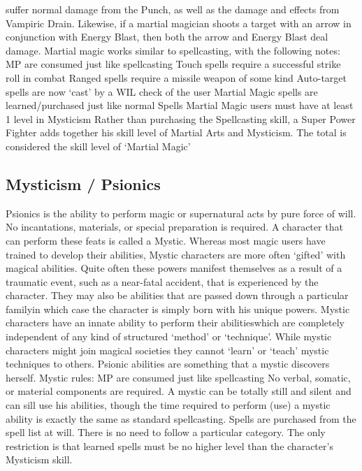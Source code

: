 \documentclass[twoside]{book}
\begin{document}
               suffer normal damage from the Punch, as well as the damage
               and effects from Vampiric Drain. Likewise, if a martial
               magician shoots a target with an arrow in conjunction with
               Energy Blast, then both the arrow and Energy Blast deal
               damage.   Martial magic works similar to spellcasting, with
               the following notes:   
                MP are consumed just like spellcasting   
                  Touch spells require a successful strike roll in
                 combat 
                  Ranged spells require a missile weapon of some
                 kind 
                  Auto-target spells are now `cast' by
                 a WIL check of the user 
                  Martial Magic spells are learned/purchased just
                 like normal Spells 
                  Martial Magic users must have at least 1 level in
                 Mysticism 
              Rather than purchasing the Spellcasting skill, a
               Super Power Fighter adds together his skill level of
               Martial Arts and Mysticism. The total is considered the
               skill level of `Martial Magic' 
\subsection{Mysticism / Psionics}
      Psionics is the ability to perform magic or
               supernatural acts by pure force of will. No incantations,
               materials, or special preparation is required. A character
               that can perform these feats is called a Mystic.   Whereas most magic users have trained to develop
               their abilities, Mystic characters are more often
               `gifted' with magical abilities. Quite often
               these powers manifest themselves as a result of a
               traumatic event, such as a near-fatal accident, that is
               experienced by the character. They may also be abilities
               that are passed down through a particular familyin
               which case the character is simply born with his unique
               powers. Mystic characters have an innate ability to
               perform their abilitieswhich are completely
               independent of any kind of structured `method'
               or `technique'. While mystic characters might
               join magical societies they cannot `learn' or
               `teach' mystic techniques to others. Psionic
               abilities are something that a mystic discovers herself.
                 Mystic rules:   
                MP are consumed just like spellcasting   
                  No verbal, somatic, or material components are
                 required. A mystic can be totally still and silent and
                 can sill use his abilities, though the time required to
                 perform (use) a mystic ability is exactly the same as
                 standard spellcasting. 
                  Spells are purchased from the spell list at will.
                 There is no need to follow a particular category. The
                 only restriction is that learned spells must be no
                 higher level than the character's Mysticism skill.
                 
\end{document}
